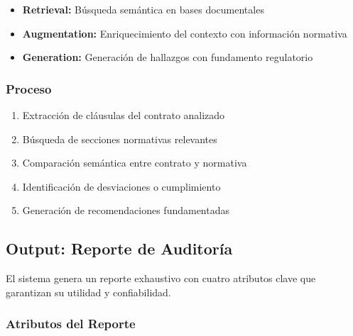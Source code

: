 \documentclass[12pt,a4paper]{article}
\begin{document}
\begin{itemize}[leftmargin=*]
    \item \textbf{Retrieval:} Búsqueda semántica en bases documentales
    \item \textbf{Augmentation:} Enriquecimiento del contexto con información normativa
    \item \textbf{Generation:} Generación de hallazgos con fundamento regulatorio
\end{itemize}

\subsubsection{Proceso}

\begin{enumerate}[leftmargin=*]
    \item Extracción de cláusulas del contrato analizado
    \item Búsqueda de secciones normativas relevantes
    \item Comparación semántica entre contrato y normativa
    \item Identificación de desviaciones o cumplimiento
    \item Generación de recomendaciones fundamentadas
\end{enumerate}

\subsection{Output: Reporte de Auditoría}

\begin{tcolorbox}[colback=lightgreen!20, colframe=lightgreen!80!black, title=Características del Reporte]
El sistema genera un reporte exhaustivo con cuatro atributos clave que garantizan su utilidad y confiabilidad.
\end{tcolorbox}

\subsubsection{Atributos del Reporte}
\end{document}
